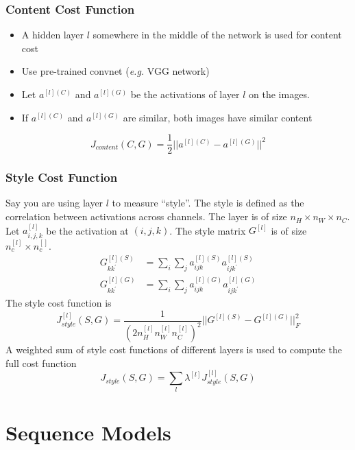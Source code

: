 \documentclass{article}
\begin{document}
\subsubsection{Content Cost Function}
\begin{itemize}
  \item A hidden layer $l$ somewhere in the middle of the network is used for content cost
  \item Use pre-trained convnet (\emph{e.g.} VGG network)
  \item Let $a^{[l](C)}$ and $a^{[l](G)}$ be the activations of layer $l$ on the images.
  \item If $a^{[l](C)}$ and $a^{[l](G)}$ are similar, both images have similar content
\end{itemize}
\begin{equation}
  J_{content}(C, G) = \frac{1}{2} ||a^{[l](C)} - a^{[l](G)}||^2
\end{equation}

\subsubsection{Style Cost Function}
Say you are using layer $l$ to measure ``style''.
The style is defined as the correlation between activations across channels.
The layer is of size $n_H\times n_W\times n_C$.
Let $a^{[l]}_{i,j,k}$ be the activation at $(i,j,k)$.
The style matrix $G^{[l]}$ is of size $n_c^{[l]}\times n_c^{[]}$.
\begin{equation}
  \begin{split}
    G^{[l](S)}_{kk^\prime}&=\sum_i\sum_j a^{[l](S)}_{ijk} a^{[l](S)}_{ijk^\prime}\\
    G^{[l](G)}_{kk^\prime}&=\sum_i\sum_j a^{[l](G)}_{ijk} a^{[l](G)}_{ijk^\prime}
  \end{split}
\end{equation}
The style cost function is
\begin{equation}
  J^{[l]}_{style}(S, G)=\frac{1}{(2n^{[l]}_Hn^{[l]}_Wn^{[l]}_C)^2}||G^{[l](S)}-G^{[l](G)}||^2_F
\end{equation}
A weighted sum of style cost functions of different layers is used to compute the full cost function
\begin{equation}
  J_{style}(S,G)=\sum_l \lambda^{[l]} J^{[l]}_{style}(S,G)
\end{equation}

\section{Sequence Models}
\end{document}
